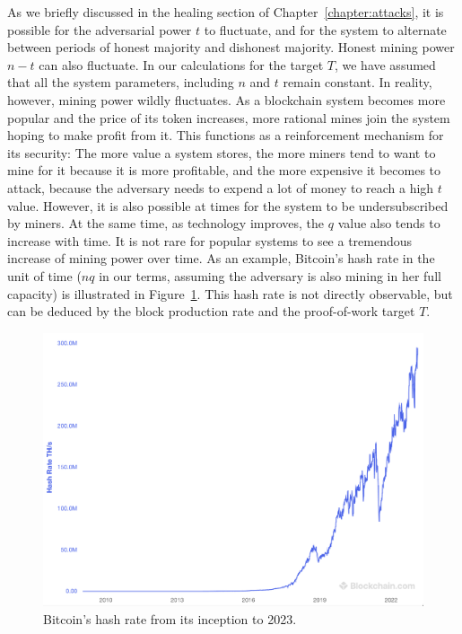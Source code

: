 As we briefly discussed in the healing section of Chapter~\ref{chapter:attacks},
it is possible for the adversarial power $t$ to fluctuate, and for the system to
alternate between periods of honest majority and dishonest majority.
Honest mining power $n - t$ can also fluctuate. In our calculations for the target $T$,
we have assumed that all the system parameters, including $n$ and $t$ remain
constant. In reality, however, mining power wildly fluctuates. As a blockchain
system becomes more popular and the price of its token increases,
more rational mines join the system hoping to make profit from it. This functions
as a reinforcement mechanism for its security: The more value a system stores,
the more miners tend to want to mine for it because it is more profitable, and
the more expensive it becomes to attack, because the adversary needs to
expend a lot of money to reach a high $t$ value. However, it is also possible
at times for the system to be undersubscribed by miners.
At the same time, as technology improves, the $q$ value also tends to increase with time.
It is not rare for popular systems to see a tremendous increase of mining
power over time. As an example, Bitcoin's hash rate in the unit of time ($nq$
in our terms, assuming the adversary is also mining in her full capacity)
is illustrated in Figure~\ref{fig.bitcoin-hashrate}. This
hash rate is not directly observable, but can be deduced by the block
production rate and the proof-of-work target $T$.

\begin{figure}[h]
  \centering
  \includegraphics[width=\columnwidth,keepaspectratio]{figures/bitcoin-hashrate.png}
  \caption{Bitcoin's hash rate from its inception to 2023.}
  \label{fig.bitcoin-hashrate}
\end{figure}

